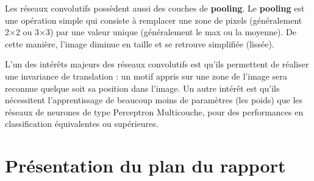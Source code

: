 Les réseaux convolutifs possèdent aussi des couches de \textbf{pooling}.
Le \textbf{pooling} est une opération simple qui consiste à remplacer une zone de pixels
(généralement 2×2 ou 3×3) par une valeur unique (généralement le max ou la moyenne).
De cette manière, l’image diminue en taille et se retrouve simplifiée (lissée).

L'un des intérêts majeurs des réseaux convolutifs est qu'ils permettent de réaliser une invariance
de translation : un motif appris sur une zone de l'image sera reconnue
quelque soit sa position dans l'image.
Un autre intérêt est qu'ils nécessitent l'apprentissage de beaucoup moins de paramètres (les poids) que les réseaux de neurones de type Perceptron Multicouche, pour des performances
en classification équivalentes ou supérieures.


\hypertarget{plan}{%
\section{Présentation du plan du rapport}%
\label{Présentation du plan du rapport}}
